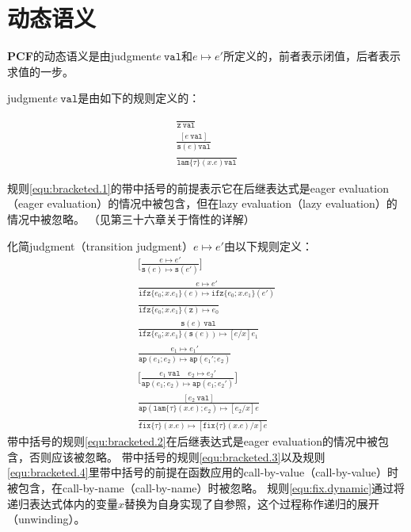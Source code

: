 \section{动态语义}

\textbf{PCF}的动态语义是由\gls{judgment}\(e\ \mathtt{val}\)和\(e \longmapsto e'\)所定义的，前者表示闭值，后者表示求值的一步。

\gls{judgment}\(e\ \mathtt{val}\)是由如下的规则定义的：

\begin{gather}
	\frac{}{
		\mathtt{z}\ \mathtt{val}
	}
	\tag{19.2a} \\
	\frac{
		[e\ \mathtt{val}]
	}{
		\mathtt{s}(e) \mathtt{val}
	}
	\tag{19.2b} 
	\label{equ:bracketed.1} \\
	\frac{}{
		\mathtt{lam}\{\tau\}(x.e) \mathtt{val}
	}
	\tag{19.2c}
\end{gather}

规则\ref{equ:bracketed.1}的带中括号的前提表示它在后继表达式是\gls{eager evaluation}（eager evaluation）的情况中被包含，但在\gls{lazy evaluation}（lazy evaluation）的情况中被忽略。
（见第三十六章关于惰性的详解）

化简\gls{judgment}（transition judgment）\(e \longmapsto e'\)由以下规则定义：
\begin{gather}
	\bigg[
	\frac{
		e \longmapsto e'
	}{
		\mathtt{s}(e) \longmapsto \mathtt{s}(e')
	}
	\bigg]
	\tag{19.3a}
	\label{equ:bracketed.2} \\
	\frac{
		e \longmapsto e'
	}{
		\mathtt{ifz}\{e_0;x.e_1\}(e) \longmapsto \mathtt{ifz}\{e_0;x.e_1\}(e')
	}
	\tag{19.3b} \\
	\frac{}{
		\mathtt{ifz}\{e_0;x.e_1\}(\mathtt{z}) \longmapsto e_0
	}
	\tag{19.3c} \\
	\frac{
		\mathtt{s}(e)\ \mathtt{val}
	}{
		\mathtt{ifz}\{e_0;x.e_1\}(\mathtt{s}(e)) \longmapsto [e/x]e_1
	}
	\tag{19.3d} \\
	\frac{
		e_1 \longmapsto e_1'
	}{
		\mathtt{ap}(e_1;e_2) \longmapsto \mathtt{ap}(e_1';e_2)
	}
	\tag{19.3e} \\
	\bigg[
	\frac{
		e_1\ \mathtt{val} \quad e_2 \longmapsto e_2'
	}{
		\mathtt{ap}(e_1;e_2) \longmapsto \mathtt{ap}(e_1;e_2')
	}
	\bigg]
	\tag{19.3f} 
	\label{equ:bracketed.3} \\
	\frac{
		[e_2\ \mathtt{val}]
	}{
		\mathtt{ap}(\mathtt{lam}\{\tau\}(x.e);e_2) \longmapsto [e_2/x]e
	}
	\tag{19.3g} 
	\label{equ:bracketed.4} \\
	\frac{}{
		\mathtt{fix}\{\tau\}(x.e) \longmapsto [\mathtt{fix}\{\tau\}(x.e)/x]e
	}
	\tag{19.3h}
	\label{equ:fix.dynamic}
\end{gather}
带中括号的规则\ref{equ:bracketed.2}在后继表达式是\gls{eager evaluation}的情况中被包含，否则应该被忽略。
带中括号的规则\ref{equ:bracketed.3}以及规则\ref{equ:bracketed.4}里带中括号的前提在函数应用的\gls{call-by-value}（call-by-value）时被包含，在\gls{call-by-name}（call-by-name）时被忽略。
规则\ref{equ:fix.dynamic}通过将递归表达式体内的变量\(x\)替换为自身实现了自参照，这个过程称作递归的展开（unwinding）。


